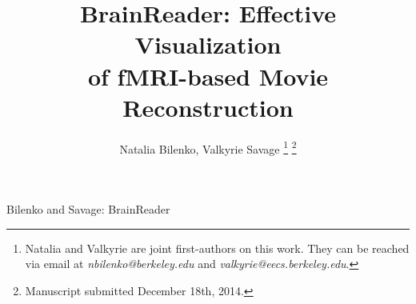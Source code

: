 \documentclass[journal]{IEEEtran}
\begin{document}

%
\title{BrainReader: Effective Visualization\\of fMRI-based Movie Reconstruction}
%
%
%

\author{Natalia Bilenko, Valkyrie Savage%
\thanks{Natalia and Valkyrie are joint first-authors on this work.  They can be reached via email at \emph{nbilenko@berkeley.edu} and \emph{valkyrie@eecs.berkeley.edu}.}%
\thanks{Manuscript submitted December 18th, 2014.}}



%
{Bilenko and Savage: BrainReader}










\maketitle
\end{document}
